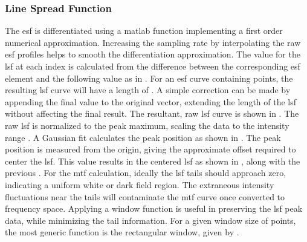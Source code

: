 \documentclass[../../../../main.tex]{subfiles}
\begin{document}
%
    \subsubsection{Line Spread Function}%
    \label{app:image-processing:modulation-transfer-function:analytical-methods:line-spread-function}%
    The \gls{esf} is differentiated using a \gls{matlab} function implementing a first order numerical approximation.
    Increasing the sampling rate by interpolating the raw \gls{esf} profiles helps to smooth the differentiation approximation.
    The value for the \gls{lsf} at each index  is calculated from the difference between the corresponding \gls{esf} element  and the following value  as in .
    For an \gls{esf} curve containing  points, the resulting \gls{lsf} curve will have a length of .
    A simple correction can be made by appending the final value  to the original vector, extending the length of the \gls{lsf} without affecting the final result.
    The resultant, raw \gls{lsf} curve is shown in .
    The raw \gls{lsf} is normalized to the peak maximum, scaling the data to the intensity range .
    A Gaussian fit calculates the peak position as shown in .
    The peak position is measured from the origin, giving the approximate offset required to center the \gls{lsf}.
    This value results in the centered \gls{lsf} as shown in , along with the previous .
    For the \gls{mtf} calculation, ideally the \gls{lsf} tails should approach zero, indicating a uniform white or dark field region.
    The extraneous intensity fluctuations near the tails will contaminate the \gls{mtf} curve once converted to frequency space.
    Applying a window function is useful in preserving the \gls{lsf} peak data, while minimizing the tail information.   
    For a given window size of  points, the most generic function is the rectangular window, given by .
\end{document}
